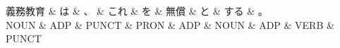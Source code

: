 \documentclass[tikz,border=5pt]{standalone}
\begin{document}
\normalsize
\begin{dependency}[edge unit distance=12.0pt]
    \begin{deptext}[column sep=1em]
        義務教育 \& は \& 、 \& これ \& を \& 無償 \& と \& する \& 。\\
        NOUN \& ADP \& PUNCT \& PRON \& ADP \& NOUN \& ADP \& VERB \& PUNCT\\
    \end{deptext}
\end{dependency}
\end{document}
